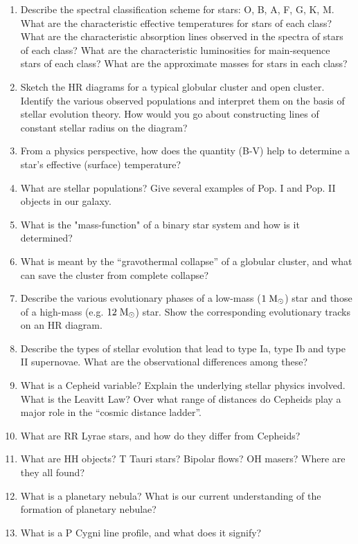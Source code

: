 \documentclass[11pt, oneside]{book}
\begin{document}
\begin{enumerate}[start=16, itemsep=0.4cm]
    \item Describe the spectral classification scheme for stars: O, B, A, F, G, K, M. What are the characteristic effective temperatures for stars of each class? What are the characteristic absorption lines observed in the spectra of stars of each class? What are the characteristic luminosities for main-sequence stars of each class? What are the approximate masses for stars in each class?
    \item Sketch the HR diagrams for a typical globular cluster and open cluster. Identify the various observed populations and interpret them on the basis of stellar evolution theory. How would you go about constructing lines of constant stellar radius on the diagram?
    \item From a physics perspective, how does the quantity (B-V) help to determine a star's effective (surface) temperature?
    \item What are stellar populations? Give several examples of Pop. I and Pop. II objects in our galaxy.
    \item What is the "mass-function" of a binary star system and how is it determined?
    \item What is meant by the ``gravothermal collapse'' of a globular cluster, and what can save the cluster from complete collapse?
    \item Describe the various evolutionary phases of a low-mass ($1 \; {\rm M_{\odot}}$) star and those of a high-mass (e.g. $12 \; {\rm M_{\odot}}$) star. Show the corresponding evolutionary tracks on an HR diagram.
    \item Describe the types of stellar evolution that lead to type Ia, type Ib and type II supernovae. What are the observational differences among these?
    \item What is a Cepheid variable? Explain the underlying stellar physics involved. What is the Leavitt Law? Over what range of distances do Cepheids play a major role in the ``cosmic distance ladder''.
    \item What are RR Lyrae stars, and how do they differ from Cepheids?
    \item What are HH objects? T Tauri stars? Bipolar flows? OH masers? Where are they all found?
    \item What is a planetary nebula? What is our current understanding of the formation of planetary nebulae?
    \item What is a P Cygni line profile, and what does it signify?

\end{enumerate}
\end{document}
